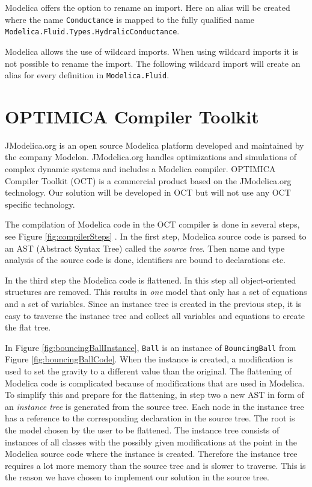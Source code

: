 \documentclass{cslthse-msc}
\begin{document}


Modelica offers the option to rename an import. Here an alias will be created where the name \texttt{Conductance} is mapped to the fully qualified name \\\texttt{Modelica.Fluid.Types.HydralicConductance}.



Modelica allows the use of wildcard imports. When using wildcard imports it is not possible to rename the import. The following wildcard import will create an alias for every definition in \texttt{Modelica.Fluid}.



\section{OPTIMICA Compiler Toolkit}
JModelica.org is an open source Modelica platform developed and maintained by the company Modelon. JModelica.org handles optimizations and simulations of complex dynamic systems and includes a Modelica compiler. OPTIMICA Compiler Toolkit (OCT) is a commercial product based on the JModelica.org technology. Our solution will be developed in OCT but will not use any OCT specific technology. 

The compilation of Modelica code in the OCT compiler is done in several steps, see Figure \ref{fig:compilerSteps} \cite{aakesson2010implementation}. In the first step, Modelica source code is parsed to an AST (Abstract Syntax Tree) called the \emph{source tree}. Then name and type analysis of the source code is done, identifiers are bound to declarations etc.

In the third step the Modelica code is flattened. In this step all object-oriented structures are removed. This results in \emph{one} model that only has a set of equations and a set of variables. Since an instance tree is created in the previous step, it is easy to traverse the instance tree and collect all variables and equations to create the flat tree.

In Figure \ref{fig:bouncingBallInstance}, \texttt{Ball} is an instance of \texttt{BouncingBall} from Figure \ref{fig:bouncingBallCode}. When the instance is created, a modification is used to set the gravity to a different value than the original. The flattening of Modelica code is complicated because of modifications that are used in Modelica. To simplify this and prepare for the flattening, in step two a new AST in form of an \emph{instance tree} is generated from the source tree. Each node in the instance tree has a reference to the corresponding declaration in the source tree. The root is the model chosen by the user to be flattened. The instance tree consists of instances of all classes with the possibly given modifications at the point in the Modelica source code where the instance is created. Therefore the instance tree requires a lot more memory than the source tree and is slower to traverse. This is the reason we have chosen to implement our solution in the source tree. 
\end{document}
